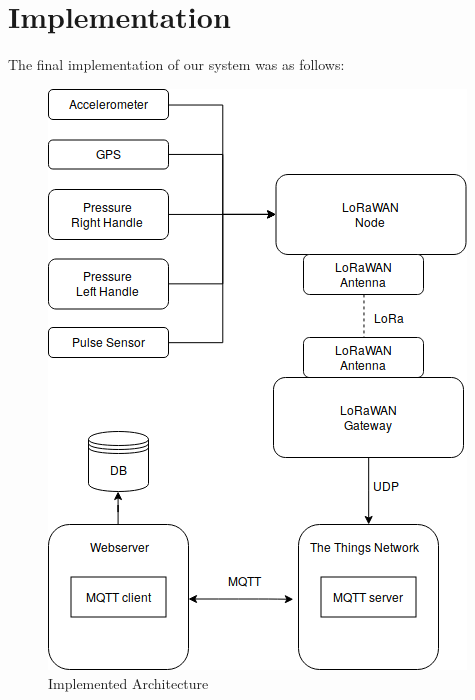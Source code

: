 \chapter{Implementation}
\label{cha:implementation}

The final implementation of our system was as follows:
\begin{figure}[h]
\centering
\includegraphics[width=1\linewidth]{gfx/architecture_implementation_h}
\caption[]{Implemented Architecture}
\label{fig:image2}
\end{figure}

